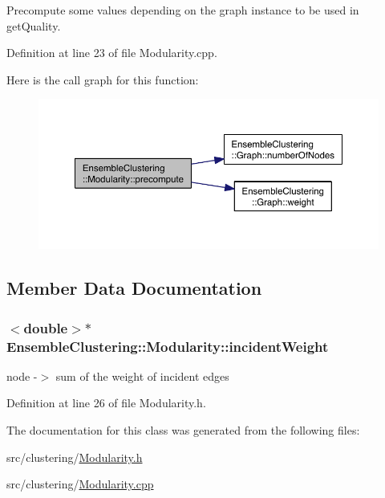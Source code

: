 Precompute some values depending on the graph instance to be used in get\-Quality. 



Definition at line 23 of file Modularity.\-cpp.



Here is the call graph for this function\-:
\nopagebreak
\begin{figure}[H]
\begin{center}
\leavevmode
\includegraphics[width=350pt]{class_ensemble_clustering_1_1_modularity_a5c449dd6b3b3485dcc497edd8dc3c156_cgraph}
\end{center}
\end{figure}




\subsection{Member Data Documentation}
\hypertarget{class_ensemble_clustering_1_1_modularity_abc6c72d596cd3f00cce8c8c87e602df1}{
\subsubsection[{incident\-Weight}]{$<$double$>$$\ast$ Ensemble\-Clustering\-::\-Modularity\-::incident\-Weight\hspace{0.3cm}{\ttfamily [protected]}}}\label{class_ensemble_clustering_1_1_modularity_abc6c72d596cd3f00cce8c8c87e602df1}


node -\/$>$ sum of the weight of incident edges 



Definition at line 26 of file Modularity.\-h.



The documentation for this class was generated from the following files\-:\begin{DoxyCompactItemize}
\item 
src/clustering/\hyperlink{_modularity_8h}{Modularity.\-h}\item 
src/clustering/\hyperlink{_modularity_8cpp}{Modularity.\-cpp}\end{DoxyCompactItemize}
